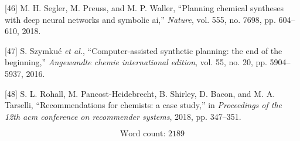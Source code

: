 \documentclass[11pt]{article}
\begin{document}
\hypertarget{citeproc_bib_item_46}{[46] M. H. Segler, M. Preuss, and M. P. Waller, “Planning chemical syntheses with deep neural networks and symbolic ai,” \textit{Nature}, vol. 555, no. 7698, pp. 604–610, 2018.}

\hypertarget{citeproc_bib_item_47}{[47] S. Szymkuć \textit{et al.}, “Computer-assisted synthetic planning: the end of the beginning,” \textit{Angewandte chemie international edition}, vol. 55, no. 20, pp. 5904–5937, 2016.}

\hypertarget{citeproc_bib_item_48}{[48] S. L. Rohall, M. Pancost-Heidebrecht, B. Shirley, D. Bacon, and M. A. Tarselli, “Recommendations for chemists: a case study,” in \textit{Proceedings of the 12th acm conference on recommender systems}, 2018, pp. 347–351.}\bigskip

\[\text{Word count: } 2189\]
\end{document}

